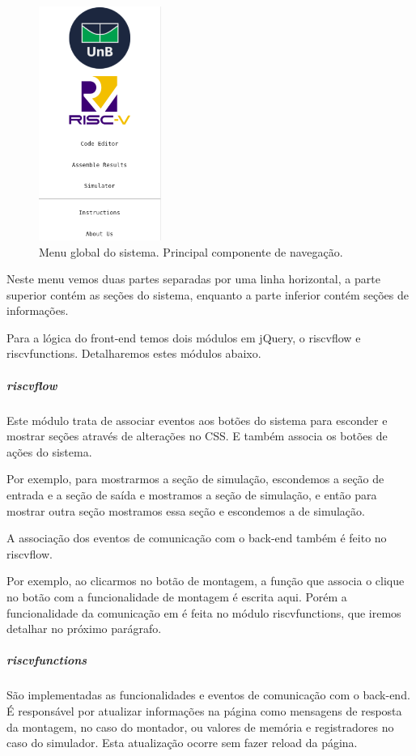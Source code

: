 			\begin{figure}[h!]
			  \centering
			  \includegraphics[width=4cm]{img/menu_global.png}
			  \caption{Menu global do sistema. Principal componente de navegação.}
			  \label{fig:menu_global}
			\end{figure}

			Neste menu vemos duas partes separadas por uma linha horizontal, a parte superior contém as seções do sistema, enquanto a parte inferior contém seções de informações.

			Para a lógica do front-end temos dois módulos em jQuery, o riscv\textunderscore flow e riscv\textunderscore functions. Detalharemos estes módulos abaixo.

			\subparagraph{riscv\textunderscore flow}

				Este módulo trata de associar eventos aos botões do sistema para esconder e mostrar seções através de alterações no CSS. E também associa os botões de ações do sistema.

				Por exemplo, para mostrarmos a seção de simulação, escondemos a seção de entrada e a seção de saída e mostramos a seção de simulação, e então para mostrar outra seção mostramos essa seção e escondemos a de simulação.

				A associação dos eventos de comunicação com o back-end também é feito no riscv\textunderscore flow.

				Por exemplo, ao clicarmos no botão de montagem, a função que associa o clique no botão com a funcionalidade de montagem é escrita aqui. Porém a funcionalidade da comunicação em é feita no módulo riscv\textunderscore functions, que iremos detalhar no próximo parágrafo.  

			\subparagraph{riscv\textunderscore functions}

				São implementadas as funcionalidades e eventos de comunicação com o back-end. É responsável por atualizar informações na página como mensagens de resposta da montagem, no caso do montador, ou valores de memória e registradores no caso do simulador. Esta atualização ocorre sem fazer reload da página.

